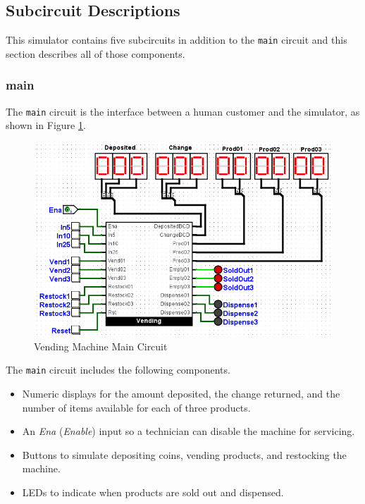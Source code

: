 \subsection{Subcircuit Descriptions}

This simulator contains five subcircuits in addition to the \lstinline[columns=fixed]|main| circuit and this section describes all of those components.

\subsubsection{main}

The \lstinline[columns=fixed]|main| circuit is the interface between a human customer and the simulator, as shown in Figure \ref{fig:vend-01}. 

\begin{figure}[H]
	\centering
	\includegraphics[width=\maxwidth{.95\linewidth}]{gfx/vend-01}
	\caption{Vending Machine Main Circuit}
	\label{fig:vend-01}
\end{figure}

The \lstinline[columns=fixed]|main| circuit includes the following components.

\begin{itemize}
	\item Numeric displays for the amount deposited, the change returned, and the number of items available for each of three products.
	\item An \textit{Ena} (\textit{Enable}) input so a technician can disable the machine for servicing.
	\item Buttons to simulate depositing coins, vending products, and restocking the machine.
	\item LEDs to indicate when products are sold out and dispensed.
\end{itemize}

